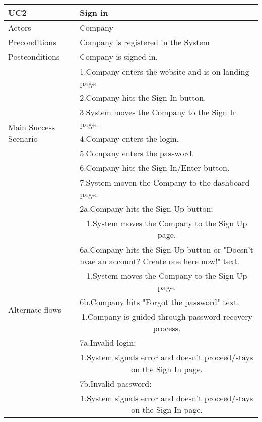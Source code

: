 \begin{table}[H]
	\centering
	\sffamily\captionsetup{justification=raggedright,singlelinecheck=false,position = below, font = sf}
	\begin{tabular}{|m{3.5cm}|m{11cm}|}
	\hline
	UC2 & Sign in \\
	\hline
	Actors & Company \\
	\hline
	Preconditions & Company is registered in the System  \\
	\hline
	Postconditions & Company is signed in. \\
	\hline
	\multirow{7}{*}{Main Success Scenario} & 1.Company enters the website and is on landing page \\
    \cline{2-2}
     & 2.Company hits the Sign In button. \\
	\cline{2-2}
     & 3.System moves the Company to the Sign In page.\\
	\cline{2-2}
     & 4.Company enters the login. \\
	\cline{2-2}
     & 5.Company enters the password. \\
	\cline{2-2}
     & 6.Company hits the Sign In/Enter button. \\
	\cline{2-2}
     & 7.System moven the Company to the dashboard page. \\
    \hline
    \multirow{10}{*}{Alternate flows} & 2a.Company hits the Sign Up button: \\
	\cline{2-2}
	& \multicolumn{1}{c|}{1.System moves the Company to the Sign Up page.} \\
	\cline{2-2}
	& 6a.Company hits the Sign Up button or "Doesn't hvae an account? Create one here now!" text. \\
	\cline{2-2}
	& \multicolumn{1}{c|}{1.System moves the Company to the Sign Up page.}	 \\
	\cline{2-2}
	& 6b.Company hits "Forgot the password" text. \\
	\cline{2-2}
	& \multicolumn{1}{c|}{1.Company is guided through password recovery process.} \\
	\cline{2-2}
	& 7a.Invalid login: \\
	\cline{2-2}
	& \multicolumn{1}{c|}{1.System signals error and doesn't proceed/stays on the Sign In page.}	 \\
	\cline{2-2}
	& 7b.Invalid password: \\
	\cline{2-2}
	& \multicolumn{1}{c|}{1.System signals error and doesn't proceed/stays on the Sign In page.} \\
    \hline
	\end{tabular}
\end{table}


